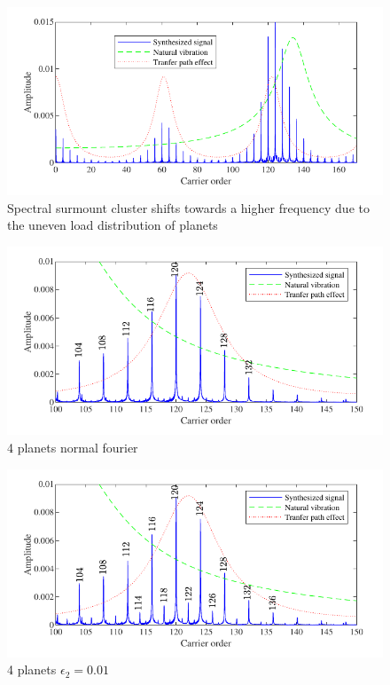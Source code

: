 \documentclass[a4paper,fleqn]{cas-sc}%
\begin{document}
\begin{figure}[pos=htbp]
    \centering
    \includegraphics[scale=1]{Shifted_natural_frequency}
    \caption{Spectral surmount cluster shifts towards a higher frequency due to the uneven load distribution of planets}\label{fig:Shifted_natural_frequency}
\end{figure}
\begin{figure}[pos=htbp]
    \centering
    \includegraphics[scale=1]{Figures/4_planet_normal_fourier.pdf}
    \caption{4 planets normal fourier}
    \label{fig:4_planet_normal_fourier}
\end{figure}
\begin{figure}[pos=htbp]
    \centering
    \includegraphics[scale=1]{Figures/4_planet_2-th-0_01_fourier.pdf}
    \caption{4 planets $\epsilon_2=0.01$\degree}
    \label{fig:4_planet_2-th-0_01_fourier}
\end{figure}
\end{document}
